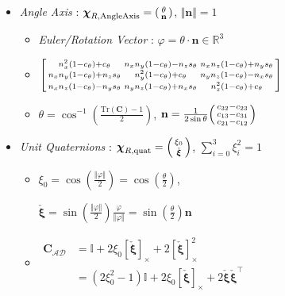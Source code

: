 \documentclass[landscape,a0paper,fontscale=0.285]{baposter} %
\newcommand{\compresslist}{ %
\setlength{\itemsep}{1pt}
\setlength{\parskip}{0pt}
\setlength{\parsep}{0pt}
}
\renewenvironment{bmatrix}{\left[\begin{smallmatrix}}{\end{smallmatrix}\right]}
\renewenvironment{pmatrix}{\left(\begin{smallmatrix}}{\end{smallmatrix}\right)}
\begin{document}
\begin{poster}
{\begin{itemize}
    \item \textit{Angle Axis} : $\boldsymbol{\chi}_{R,\text{AngleAxis}}=\begin{pmatrix}\theta \\ \mathbf{n}\end{pmatrix}$, $\Vert \mathbf{n}\Vert=1$
    \begin{itemize}[label={}]\compresslist
        \item \textit{Euler/Rotation Vector} : $\varphi = \theta \cdot \mathbf{n} \in \mathbb{R}^3$
    \end{itemize}
    \begin{itemize}[label={}, leftmargin=-5pt]\compresslist
        \item $\begin{bmatrix}n_x^2(1-c_\theta)+c_\theta & n_xn_y(1-c_\theta)-n_zs_\theta & n_xn_z(1-c_\theta)+n_ys_\theta \\ n_xn_y(1-c_\theta)+n_zs_\theta & n_y^2(1-c_\theta)+c_\theta & n_yn_z(1-c_\theta)-n_xs_\theta \\ n_xn_z(1-c_\theta)-n_ys_\theta & n_yn_z(1-c_\theta)+n_xs_\theta & n_z^2(1-c_\theta)+c_\theta \end{bmatrix}$
    \end{itemize}
    \begin{itemize}[label={}]\compresslist
        \item $\theta=\cos^{-1}\left(\frac{\text{Tr}(\mathbf{C})-1}{2}\right)$, $\mathbf{n}=\frac{1}{2\sin\theta}\begin{pmatrix}c_{32} - c_{23} \\ c_{13} - c_{31} \\ c_{21} - c_{12}\end{pmatrix}$
    \end{itemize}

    \item \textit{Unit Quaternions} : $\boldsymbol{\chi}_{R,\text{quat}}=\begin{pmatrix}\xi_0 \\ \check{\boldsymbol{\xi}}\end{pmatrix}$, $\sum_{i=0}^3\xi_i^2=1$
    \begin{itemize}[label=$\circ$]\compresslist
        \item $\xi_0 = \cos\left(\frac{\Vert \varphi\Vert}{2}\right)=\cos\left(\frac{\theta}{2}\right)$, 
        
        $\check{\boldsymbol{\xi}}=\sin\left(\frac{\Vert\varphi\Vert}{2}\right)\frac{\varphi}{\Vert\varphi\Vert} = \sin\left(\frac{\theta}{2}\right)\mathbf{n}$
        \item $\begin{aligned}\mathbf{C}_{\mathcal{AD}} &= \mathbb{I} + 2\xi_0\left[\check{\boldsymbol{\xi}}\right]_{\times} + 2\left[\check{\boldsymbol{\xi}}\right]^2_{\times} \\&= (2\xi_0^2-1)\mathbb{I}+2\xi_0\left[\check{\boldsymbol{\xi}}\right]_{\times} + 2\check{\boldsymbol{\xi}}\check{\boldsymbol{\xi}}^\top\end{aligned}$ 
        

\end{itemize}
\end{itemize}}
\end{poster}
\end{document}
